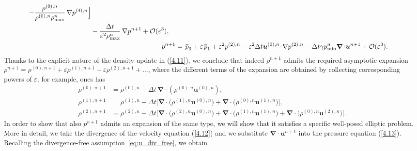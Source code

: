 \documentclass[A4paper,12pt,twoside]{article}
\newenvironment{proof}{{\flushleft \bf Proof:}}{}
\numberwithin{equation}{section}
\numberwithin{figure}{section}
\numberwithin{table}{section}
\def\muu {\bm{u}}
\def\bnabla{\bm{\nabla}}
\newcommand{\dt}{\Delta t}
\newcommand{\ve}{\varepsilon}
\newcommand\eref[1]{(\ref{#1})}
\newcommand*\xbar[1]{%
  \hbox{%
    \vbox{%
      \hrule height 0.5pt %
      \kern0.4ex%
      \hbox{%
        \kern-0.05em%
        \ensuremath{#1}%
        \kern-0.00em%
      }%
    }%
  }%
}
\begin{document}
\begin{proof}
\begin{align}
\begin{aligned}
-\frac{\rho^{(0),n}}{\rho^{(0),n}\rho_{\max}^n}\,\nabla p^{(4),n}
\Big]\\
&-\frac{\dt}{\ve^2 \rho_{\max}^n}\,\nabla p^{n+1}+{\cal O}(\ve^3),\label{4.12}
\end{aligned}\\
p^{n+1}&=\,\xbar p_0+\ve\,\xbar p_1+\ve^2 p^{(2),n}-\ve^2 \dt \bm u^{(0),n}\!\cdot\!\nabla p^{(2),n} -\dt\gamma p_{\min}^n\bnabla\!\cdot\!\bm u^{n+1}+{\cal O}(\ve^3).\label{4.13}
\end{align}
Thanks to the explicit nature of the density update in \eref{4.11}, we conclude that indeed $\rho^{n+1}$ admits the required asymptotic expansion $\rho^{n+1}=\rho^{(0),n+1}+\ve\rho^{(1),n+1}+\ve\rho^{(2),n+1}+\dots$, where the different terms of the expansion are obtained by collecting corresponding powers of $\ve$; for example, ones has
\begin{align*}
	\rho^{(0),n+1}&=\rho^{(0),n}-\dt\,\bnabla\!\cdot\!(\rho^{(0),n}\bm u^{(0),n}),\\
	\rho^{(1),n+1}&=\rho^{(1),n}-\dt \big[\bnabla\!\cdot\!\big(\rho^{(1),n}\bm u^{(0),n}\big)+\bnabla\!\cdot\!\big(\rho^{(0),n}\bm u^{(1),n}\big)\big],\\
	\rho^{(2),n+1}&=\rho^{(2),n}-\dt \big[\bnabla\!\cdot\!\big(\rho^{(2),n}\bm u^{(0),n}\big)+\bnabla\!\cdot\!\big(\rho^{(1),n}\bm u^{(1),n}\big)+\bnabla\!\cdot\!\big(\rho^{(0),n}\bm u^{(2),n}\big)\big].
\end{align*}
In order to show that also $p^{n+1}$ admits an expansion of the same type, we will show that it satisfies a specific well-posed elliptic problem. More in detail, we take the divergence of the velocity equation \eref{4.12} and we substitute
$\bnabla\!\cdot\!\muu^{n+1}$ into the pressure equation \eref{4.13}. Recalling the divergence-free assumption~\eqref{eq:u_div_free}, we obtain


\end{proof}
\end{document}
